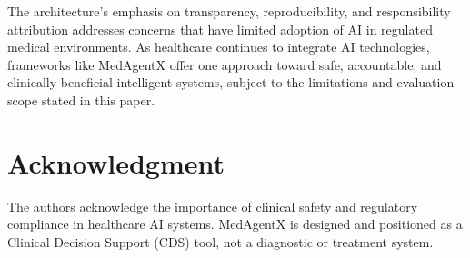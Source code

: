 \documentclass[journal]{IEEEtran}
\begin{document}
The architecture's emphasis on transparency, reproducibility, and responsibility attribution addresses concerns that have limited adoption of AI in regulated medical environments. As healthcare continues to integrate AI technologies, frameworks like MedAgentX offer one approach toward safe, accountable, and clinically beneficial intelligent systems, subject to the limitations and evaluation scope stated in this paper.

\section*{Acknowledgment}
The authors acknowledge the importance of clinical safety and regulatory compliance in healthcare AI systems. MedAgentX is designed and positioned as a Clinical Decision Support (CDS) tool, not a diagnostic or treatment system.

\end{document}
